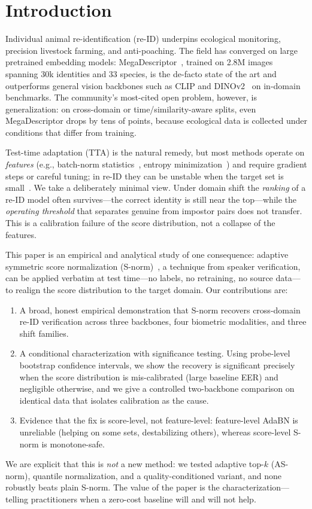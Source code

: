 \documentclass[conference]{IEEEtran}
\begin{document}
\section{Introduction}
Individual animal re-identification (re-ID) underpins ecological monitoring, precision livestock
farming, and anti-poaching. The field has converged on large pretrained embedding models:
MegaDescriptor~\cite{cermak2024}, trained on 2.8M images spanning 30k identities and 33 species, is
the de-facto state of the art and outperforms general vision backbones such as CLIP and
DINOv2~\cite{oquab2024} on in-domain benchmarks. The community's most-cited open problem, however,
is generalization: on cross-domain or time/similarity-aware splits, even MegaDescriptor drops by
tens of points, because ecological data is collected under conditions that differ from training.

Test-time adaptation (TTA) is the natural remedy, but most methods operate on \emph{features}
(e.g., batch-norm statistics~\cite{li2017}, entropy minimization~\cite{wang2021}) and require
gradient steps or careful tuning; in re-ID they can be unstable when the target set is
small~\cite{dart2025}. We take a deliberately minimal view. Under domain shift the \emph{ranking} of
a re-ID model often survives---the correct identity is still near the top---while the \emph{operating
threshold} that separates genuine from impostor pairs does not transfer. This is a calibration
failure of the score distribution, not a collapse of the features.

This paper is an empirical and analytical study of one consequence: adaptive symmetric score
normalization (S-norm)~\cite{auckenthaler2000}, a technique from speaker verification, can be applied
verbatim at test time---no labels, no retraining, no source data---to realign the score distribution
to the target domain. Our contributions are:
\begin{enumerate}
\item A broad, honest empirical demonstration that S-norm recovers cross-domain re-ID verification
across three backbones, four biometric modalities, and three shift families.
\item A conditional characterization with significance testing. Using probe-level bootstrap
confidence intervals, we show the recovery is significant precisely when the score distribution is
mis-calibrated (large baseline EER) and negligible otherwise, and we give a controlled two-backbone
comparison on identical data that isolates calibration as the cause.
\item Evidence that the fix is score-level, not feature-level: feature-level AdaBN is unreliable
(helping on some sets, destabilizing others), whereas score-level S-norm is monotone-safe.
\end{enumerate}
We are explicit that this is \emph{not} a new method: we tested adaptive top-$k$ (AS-norm), quantile
normalization, and a quality-conditioned variant, and none robustly beats plain S-norm. The value of
the paper is the characterization---telling practitioners when a zero-cost baseline will and will not
help.
\end{document}
